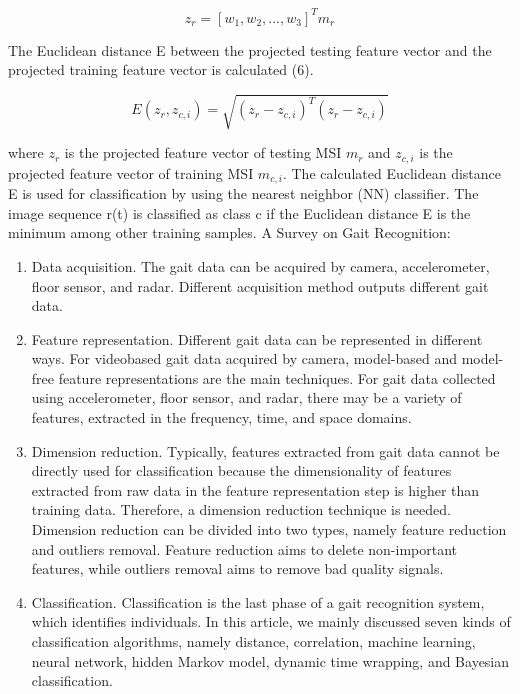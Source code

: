 \documentclass{style1}
\begin{document}
\begin{equation}
z_r = [w_1, w_2,..., w_3]^Tm_{r}
\label{eq:5}
\end{equation}

The Euclidean distance E between the projected testing feature vector and the projected  training feature vector is calculated (6).

\begin{equation}
E(z_r, z_{c,i}) = \sqrt{(z_r - z_{c,i})^T(z_r - z_{c,i})}
\label{eq:5}
\end{equation}

where $z_r$ is the projected feature vector of testing MSI $m_r$ and $z_{c,i}$ is the projected feature vector of training MSI $m_{c,i}$. The calculated Euclidean distance E is used for classification by using the nearest neighbor (NN) classifier. The image sequence r(t) is classified as class c if the Euclidean distance E is the minimum among other training samples.
A Survey on Gait Recognition:
\begin{enumerate}
\item Data acquisition. The gait data can be acquired by camera, accelerometer, floor sensor, and radar. Different acquisition method outputs different gait data. 
\item Feature representation. Different gait data can be represented in different ways. For videobased gait data acquired by camera, model-based and model-free feature representations are the main techniques. For gait data collected using accelerometer, floor sensor, and radar, there may be a variety of features, extracted in the frequency, time, and space domains. 
\item Dimension reduction. Typically, features extracted from gait data cannot be directly used for classification because the dimensionality of features extracted from raw data in the feature representation step is higher than training data. Therefore, a dimension reduction technique is needed. Dimension reduction can be divided into two types, namely feature reduction and outliers removal. Feature reduction aims to delete non-important features, while outliers removal aims to remove bad quality signals.
\item Classification. Classification is the last phase of a gait recognition system, which identifies individuals. In this article, we mainly discussed seven kinds of classification algorithms, namely distance, correlation, machine learning, neural network, hidden Markov model, dynamic time wrapping, and Bayesian classification.
\end{enumerate}
\end{document}
